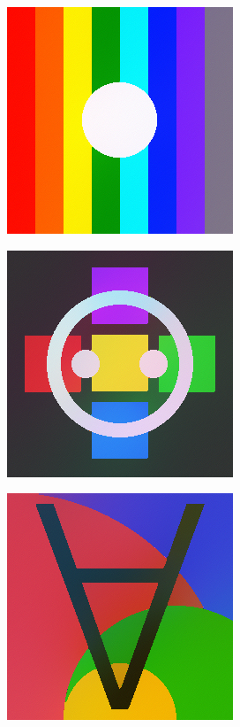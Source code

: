 \documentclass[xcolor=dvipsnames, xetex,serif]{beamer}
\numberwithin{equation}{section}
\begin{document}
\begin{frame}
\begin{figure}[H]
\begin{subfigure}{0.3\linewidth}
					\includegraphics[width=0.7\linewidth]{images/result_ex1/timemarch03.png}
				\end{subfigure}
				\begin{subfigure}{0.3\linewidth}
					\centering
					\includegraphics[width=0.7\linewidth]{images/result_ex1/timemarch04.png}
				\end{subfigure}
				\begin{subfigure}{0.3\linewidth}
					\centering
					\includegraphics[width=0.7\linewidth]{images/result_ex1/timemarch05.png}

\end{subfigure}
\end{figure}
\end{frame}
\end{document}
